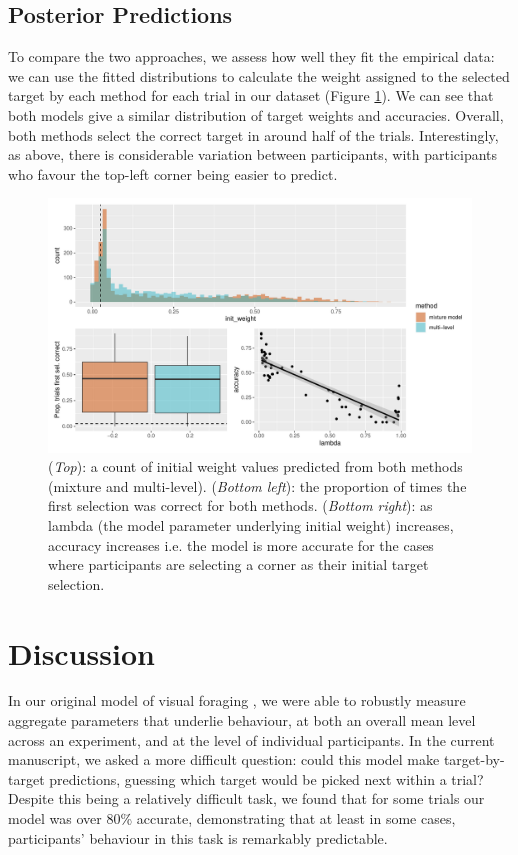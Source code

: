 \documentclass[preprints, article,submit,pdftex,moreauthors]{Definitions/mdpi}
\begin{document}
\subsection{Posterior Predictions}

To compare the two approaches, we assess how well they fit the empirical data: we can use the fitted distributions to calculate the weight assigned to the selected target by each method for each trial in our dataset (Figure \ref{fig:qjep_init_sel_pred}). We can see that both models give a similar distribution of target weights and accuracies. Overall, both methods  select the correct target in around half of the trials. Interestingly, as above, there is considerable variation between participants, with participants who favour the top-left corner being easier to predict. 

\begin{figure}[H]
\centering
\includegraphics[width=12 cm]{Figures/qjep_init_sel_preds.pdf}
\caption{(\textit{Top}): a count of initial weight values predicted from both methods (mixture and multi-level). (\textit{Bottom left}): the proportion of times the first selection was correct for both methods.  (\textit{Bottom right}): as lambda (the model parameter underlying initial weight) increases, accuracy increases i.e. the model is more accurate for the cases where participants are selecting a corner as their initial target selection.} 
\label{fig:qjep_init_sel_pred}
\end{figure} 

\section{Discussion}

In our original model of visual foraging \citep{clarke2022foraging}, we were able to robustly measure aggregate parameters that underlie behaviour, at both an overall mean level across an experiment, and at the level of individual participants. In the current manuscript, we asked a more difficult question: could this model make target-by-target predictions, guessing which target would be picked next within a trial? Despite this being a relatively difficult task, we found that for some trials our model was over 80\% accurate, demonstrating that at least in some cases, participants' behaviour in this task is remarkably predictable. 
\end{document}
